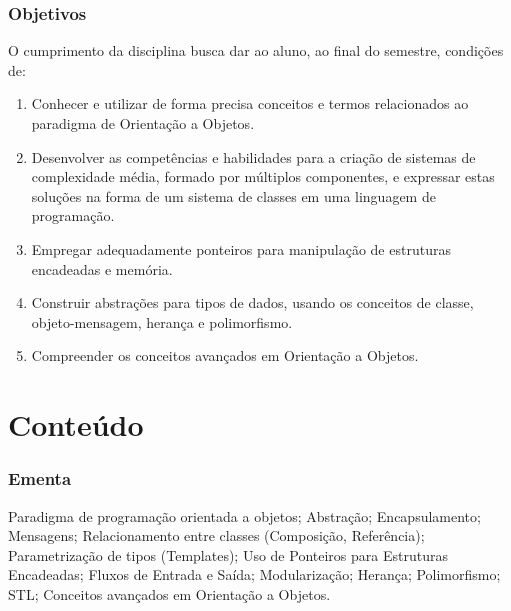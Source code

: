 \documentclass[aspectratio=169]{beamer}
\begin{document}
\begin{frame}\frametitle{Objetivos}
O cumprimento da disciplina busca dar ao aluno, ao final do semestre, condições de:
\begin{enumerate}
	\item Conhecer e utilizar de forma precisa conceitos e termos relacionados ao paradigma de Orientação a Objetos.
	\item Desenvolver as competências e habilidades para a criação de sistemas de complexidade média, formado por múltiplos componentes, e expressar estas soluções na forma de um sistema de classes em uma linguagem de programação.
	\item Empregar adequadamente ponteiros para manipulação de estruturas encadeadas e memória.
	\item Construir abstrações para tipos de dados, usando os conceitos de classe, objeto-mensagem, herança e polimorfismo.
	\item Compreender os conceitos avançados em Orientação a Objetos.
\end{enumerate}
\end{frame}

\section{Conte\'udo}

\begin{frame}\frametitle{Ementa}
Paradigma de programação orientada a objetos; Abstração; Encapsulamento; Mensagens; Relacionamento entre classes (Composição, Referência); Parametrização de tipos (Templates); Uso de Ponteiros para Estruturas Encadeadas; Fluxos de Entrada e Saída; Modularização; Herança; Polimorfismo; STL; Conceitos avançados em Orientação a Objetos.
\end{frame}
\end{document}
